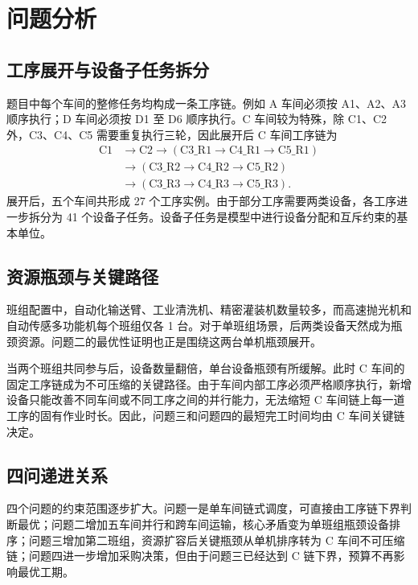 \section{问题分析}

\subsection{工序展开与设备子任务拆分}

题目中每个车间的整修任务均构成一条工序链。例如 A 车间必须按 A1、A2、A3 顺序执行；D 车间必须按 D1 至 D6 顺序执行。C 车间较为特殊，除 C1、C2 外，C3、C4、C5 需要重复执行三轮，因此展开后 C 车间工序链为
\begin{align*}
\text{C1}&\rightarrow \text{C2}
\rightarrow(\text{C3\_R1}\rightarrow \text{C4\_R1}\rightarrow \text{C5\_R1})\\
&\rightarrow(\text{C3\_R2}\rightarrow \text{C4\_R2}\rightarrow \text{C5\_R2})\\
&\rightarrow(\text{C3\_R3}\rightarrow \text{C4\_R3}\rightarrow \text{C5\_R3}) .
\end{align*}
展开后，五个车间共形成 27 个工序实例。由于部分工序需要两类设备，各工序进一步拆分为 41 个设备子任务。设备子任务是模型中进行设备分配和互斥约束的基本单位。

\subsection{资源瓶颈与关键路径}

班组配置中，自动化输送臂、工业清洗机、精密灌装机数量较多，而高速抛光机和自动传感多功能机每个班组仅各 1 台。对于单班组场景，后两类设备天然成为瓶颈资源。问题二的最优性证明也正是围绕这两台单机瓶颈展开。

当两个班组共同参与后，设备数量翻倍，单台设备瓶颈有所缓解。此时 C 车间的固定工序链成为不可压缩的关键路径。由于车间内部工序必须严格顺序执行，新增设备只能改善不同车间或不同工序之间的并行能力，无法缩短 C 车间链上每一道工序的固有作业时长。因此，问题三和问题四的最短完工时间均由 C 车间关键链决定。

\subsection{四问递进关系}

四个问题的约束范围逐步扩大。问题一是单车间链式调度，可直接由工序链下界判断最优；问题二增加五车间并行和跨车间运输，核心矛盾变为单班组瓶颈设备排序；问题三增加第二班组，资源扩容后关键瓶颈从单机排序转为 C 车间不可压缩链；问题四进一步增加采购决策，但由于问题三已经达到 C 链下界，预算不再影响最优工期。

